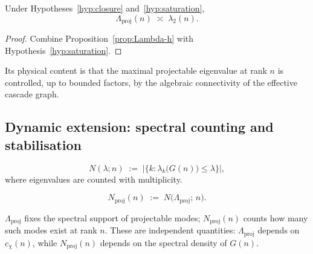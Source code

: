     \begin{corollary}
      \label{cor:linear-law}
      Under Hypotheses~\ref{hyp:closure} and~\ref{hyp:saturation},
      \begin{equation}
        \label{eq:Lambda-linear}
        \Lambda_{\mathrm{proj}}(n) \;\asymp\; \lambda_2(n).
      \end{equation}
    \end{corollary}

    \begin{proof}
      Combine Proposition~\ref{prop:Lambda-h} with Hypothesis~\ref{hyp:saturation}.
    \end{proof}

    \noindent
    Its physical content is that the maximal projectable eigenvalue at rank $n$ is
    controlled, up to bounded factors, by the algebraic connectivity of the
    effective cascade graph.

  \subsection{Dynamic extension: spectral counting and stabilisation}
    \label{sec:framework:dynamic}

    \begin{definition}
      \label{def:counting}
      \begin{equation}
        \label{eq:counting-def}
        N(\lambda; n)
        \;:=\; \bigl|\bigl\{k : \lambda_k\bigl(G(n)\bigr) \leq \lambda\bigr\}\bigr|,
      \end{equation}
      where eigenvalues are counted with multiplicity.
    \end{definition}

    \begin{definition}
      \label{def:Nproj}
      \begin{equation}
        \label{eq:Nproj-def}
        N_{\mathrm{proj}}(n)
        \;:=\; N\bigl(\Lambda_{\mathrm{proj}};\, n\bigr).
      \end{equation}
    \end{definition}

    \noindent
    $\Lambda_{\mathrm{proj}}$ fixes the spectral support of projectable modes;
    $N_{\mathrm{proj}}(n)$ counts how many such modes exist at rank $n$.
    These are independent quantities: $\Lambda_{\mathrm{proj}}$ depends on
    $c_\chi(n)$, while $N_{\mathrm{proj}}(n)$ depends on the spectral density of
    $G(n)$.

